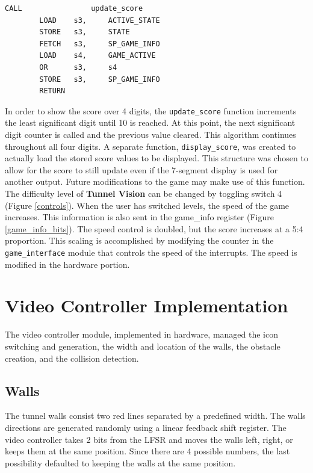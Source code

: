 \documentclass[11pt]{article}
\begin{document}
\vspace{12pt}

\begin{lstlisting}[caption=Update the state and game info, label=active]		
		CALL				update_score				
		LOAD 	s3,		ACTIVE_STATE
		STORE	s3,		STATE
		FETCH	s3,		SP_GAME_INFO
		LOAD 	s4,		GAME_ACTIVE
		OR		s3,		s4					
		STORE	s3,		SP_GAME_INFO
		RETURN
 \end{lstlisting}


\hspace{16pt}In order to show the score over 4 digits, the \texttt{update\_score} function increments the least significant digit until 10 is reached.  At this point, the next significant digit counter is called and the previous value cleared.  This algorithm continues throughout all four digits. A separate function, \texttt{display\_score}, was created to actually load the stored score values to be displayed.  This structure was chosen to allow for the score to still update even if the 7-segment display is used for another output.  Future modifications to the game may make use of this function.\\		

\hspace{16pt} The difficulty level of \textbf{Tunnel Vision} can be changed by toggling switch 4 (Figure \ref{controls}). When the user has switched levels, the speed of the game increases.  This information is also sent in the game\_info register (Figure \ref{game_info_bits}).  The speed control is doubled, but the score increases at a 5:4 proportion.  This scaling is accomplished by modifying the counter in the \texttt{game\_interface} module that controls the speed of the interrupts. The speed is modified in the hardware portion.\\

	
\section{Video Controller Implementation}
	The video controller module, implemented in hardware, managed the icon switching and generation, the width and location of the walls, the obstacle creation, and the collision detection.
	
	


\subsection{Walls}
The tunnel walls consist two red lines separated by a predefined width.  The walls directions are generated randomly using a linear feedback shift register. The video controller takes 2 bits from the LFSR and moves the walls left, right, or keeps them at the same position.  Since there are 4 possible numbers, the last possibility defaulted to keeping the walls at the same position.  \\
\end{document}
